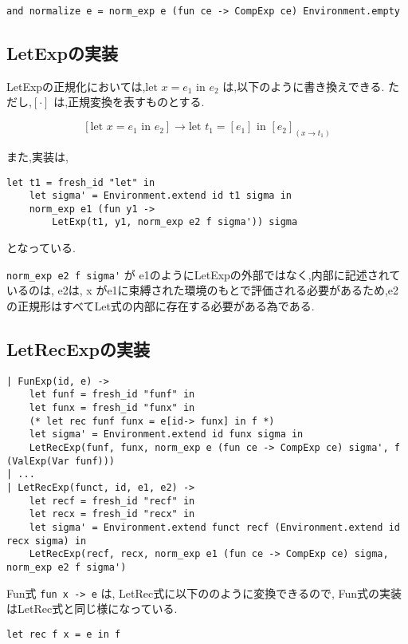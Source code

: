 \begin{lstlisting}[caption=normal.mlの実装]
and normalize e = norm_exp e (fun ce -> CompExp ce) Environment.empty
\end{lstlisting}

\subsection*{LetExpの実装}

LetExpの正規化においては,$\text{let } x = e_1 \text{ in } e_2$ は,以下のように書き換えできる.
ただし,$[\cdot]$ は,正規変換を表すものとする.

$$
[ \text{let } x = e_1 \text{ in } e_2 ] \rightarrow
\text{let } t_1 = [e_1] \text{ in } [e_2]_{(x \rightarrow t_1)}
$$


また,実装は,

\begin{lstlisting}
let t1 = fresh_id "let" in
    let sigma' = Environment.extend id t1 sigma in
    norm_exp e1 (fun y1 -> 
        LetExp(t1, y1, norm_exp e2 f sigma')) sigma
\end{lstlisting}

となっている.

\lstinline{norm_exp e2 f sigma'} が e1のようにLetExpの外部ではなく,内部に記述されているのは,
e2は, x がe1に束縛された環境のもとで評価される必要があるため,e2の正規形はすべてLet式の内部に存在する必要がある為である.

\subsection*{LetRecExpの実装}

\begin{lstlisting}
| FunExp(id, e) -> 
    let funf = fresh_id "funf" in
    let funx = fresh_id "funx" in
    (* let rec funf funx = e[id-> funx] in f *)
    let sigma' = Environment.extend id funx sigma in
    LetRecExp(funf, funx, norm_exp e (fun ce -> CompExp ce) sigma', f (ValExp(Var funf)))
| ...
| LetRecExp(funct, id, e1, e2) -> 
    let recf = fresh_id "recf" in
    let recx = fresh_id "recx" in
    let sigma' = Environment.extend funct recf (Environment.extend id recx sigma) in
    LetRecExp(recf, recx, norm_exp e1 (fun ce -> CompExp ce) sigma, norm_exp e2 f sigma')
\end{lstlisting}

Fun式 \lstinline{fun x -> e} は, LetRec式に以下ののように変換できるので, Fun式の実装はLetRec式と同じ様になっている.

\begin{lstlisting}
let rec f x = e in f
\end{lstlisting}

